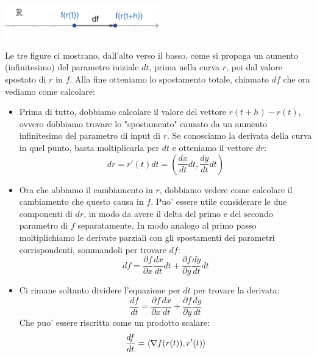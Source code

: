 \documentclass{report}
\begin{document}
\begin{center}
  \includegraphics[width=0.5\textwidth]{img/2024-05-05-18-08-01.png}
\end{center}
Le tre figure ci mostrano, dall'alto verso il basso, come si propaga un aumento (infinitesimo) del parametro iniziale $ dt $, prima nella curva $ r $, poi dal valore spostato di $ r $ in $ f $. Alla fine otteniamo lo spostamento totale, chiamato $ df $ che ora vediamo come calcolare:
\begin{itemize}
  \item Prima di tutto, dobbiamo calcolare il valore del vettore $ r(t+h)-r(t) $, ovvero dobbiamo trovare lo "spostamento" causato da un aumento infinitesimo del parametro di input di $ r $. Se conosciamo la derivata della curva in quel punto, basta moltiplicarla per $ dt $ e otteniamo il vettore $ dr $:
    \[
      dr = r'(t)dt = (\frac{dx}{dt}dt, \frac{dy}{dt}dt)
    \]
  \item Ora che abbiamo il cambiamento in $ r $, dobbiamo vedere come calcolare il cambiamento che questo causa in $ f $. Puo' essere utile considerare le due componenti di $ dr $, in modo da avere il delta del primo e del secondo parametro di $ f $ separatamente. In modo analogo al primo passo moltiplichiamo le derivate parziali con gli spostamenti dei parametri corrispondenti, sommandoli per trovare $ df $:
    \[
    df = \frac{\partial f}{\partial x}\frac{dx}{dt}dt + \frac{\partial f}{\partial y}\frac{dy}{dt}dt
    \]
  \item Ci rimane soltanto dividere l'equazione per $ dt $ per trovare la derivata:
    \[
    \frac{df}{dt} = \frac{\partial f}{\partial x}\frac{dx}{dt}+\frac{\partial f}{\partial y}\frac{dy}{dt}
    \]
    Che puo' essere riscritta come un prodotto scalare:
    \[
      \frac{df}{dt} = \langle \nabla f(r(t)), r'(t) \rangle
    \]
\end{itemize}
\end{document}
